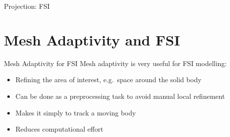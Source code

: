 \documentclass[	%
	bigger, %
	hyperref, %
	xcolor,	%
	t,		%
]{beamer}
\begin{document}
\begin{frame}{Projection: FSI}
{\begin{figure}
 \end{figure}
}
\end{frame}



\section{Mesh Adaptivity and FSI}

\begin{frame}{Mesh Adaptivity for FSI}
 Mesh adaptivity is very useful for FSI modelling:
 \begin{itemize}
  \item Refining the area of interest, e.g.~space around the solid body
  \item Can be done as a preprocessing task to avoid manual local refinement
  \item Makes it simply to track a moving body
  \item Reduces computational effort
 \end{itemize}
\end{frame}
\end{document}
